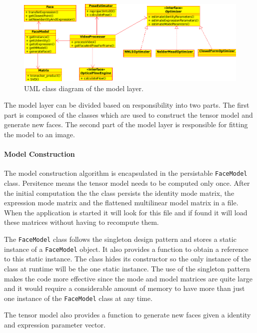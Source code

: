 \documentclass[11pt,a4paper]{report}
\begin{document}
\begin{figure}[H]
\begin{centering}
\includegraphics[scale=0.67]{images/modellayer.png}
\par\end{centering}

\caption{UML class diagram of the model layer.}
\label{fg:modellayer}
\end{figure}

The model layer can be divided based on responsibility into two parts. The first
part is composed of the classes which are used to construct the tensor
model and generate new faces. The second part of the model layer is responsible for fitting the model
to an image.

\paragraph{Model Construction}
The model construction algorithm is encapsulated in the persistable \texttt{FaceModel}
class. Persitence means the tensor model needs to be computed only once. After
the initial computation the the class persists the identity mode
matrix, the expression mode matrix and the flattened multilinear model matrix in
a file. When the application is started it will look for this file and if found
it will load these matrices without having to recompute them. 

The \texttt{FaceModel} class follows the singleton design pattern and stores a static instance of a
\texttt{FaceModel} object. It also provides a function to obtain a reference to
this static instance. The class hides its constructor so the only instance of the
class at runtime will be the one static instance. The use of the singleton
pattern makes the code more effective since the mode and model matrices are
quite large and it would require a considerable amount of memory to have more than just one
instance of the \texttt{FaceModel} class at any time.

The tensor model also provides a function to generate new faces given a identity
and expression parameter vector. 
\end{document}
